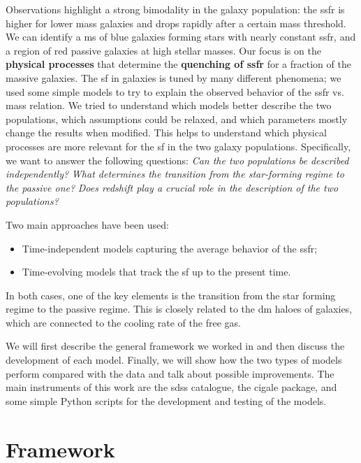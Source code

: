 \documentclass[fleqn, usenatbib]{mnras}
\begin{document}
Observations highlight a strong bimodality in the galaxy population: the \acrlong{ssfr} is higher for lower mass galaxies and drops rapidly after a certain mass threshold. We can identify a \acrfull{ms} of blue galaxies forming stars with nearly constant \acrshort{ssfr}, and a region of red passive galaxies at high stellar masses. Our focus is on the \textbf{physical processes} that determine the \textbf{quenching of \acrshort{ssfr}} for a fraction of the massive galaxies. The \acrfull{sf} in galaxies is tuned by many different phenomena; we used some simple models to try to explain the observed behavior of the \acrshort{ssfr} vs. mass relation. We tried to understand which models better describe the two populations, which assumptions could be relaxed, and which parameters mostly change the results when modified. This helps to understand which physical processes are more relevant for the \acrshort{sf} in the two galaxy populations. Specifically, we want to answer the following questions: \textit{Can the two populations be described independently?} \textit{What determines the transition from the star-forming regime to the passive one?} \textit{Does redshift play a crucial role in the description of the two populations?}

Two main approaches have been used:
\begin{itemize}
	\item Time-independent models capturing the average behavior of the \acrshort{ssfr};
	\item Time-evolving models that track the \acrlong{sf} up to the present time.
\end{itemize}
In both cases, one of the key elements is the transition from the star forming regime to the passive regime. This is closely related to the \acrfull{dm} haloes of galaxies, which are connected to the cooling rate of the free gas.

We will first describe the general framework we worked in and then discuss the development of each model. Finally, we will show how the two types of models perform compared with the data and talk about possible improvements. The main instruments of this work are the \acrlong{sdss} catalogue, the \acrshort{cigale} package, and some simple Python scripts for the development and testing of the models.

\section{Framework}
\end{document}
